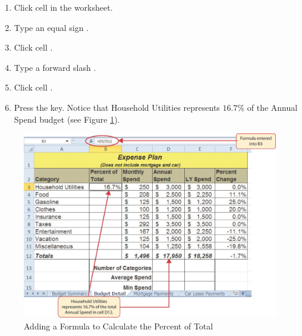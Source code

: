 \begin{enumbox}
	\begin{enumerate}
		\item Click cell  in the  worksheet.
		\item Type an equal sign \fmtTyping{=}.
		\item Click cell .
		\item Type a forward slash \fmtTyping{/}.
		\item Click cell .
		\item Press the  key. Notice that Household Utilities represents $ 16.7$\% of the Annual Spend budget (see Figure \ref{02:fig14}).
	\end{enumerate}
\end{enumbox}

\begin{figure}[H]
	\centering
	\includegraphics[width=\maxwidth{.95\linewidth}]{gfx/ch02_fig14}
	\caption{Adding a Formula to Calculate the Percent of Total}
	\label{02:fig14}
\end{figure}

